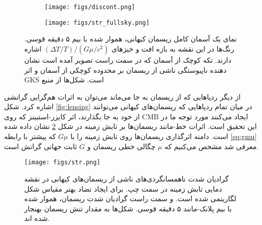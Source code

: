      
\begin{figure}[h!]
	\centering
	\begin{subfigure}[t]{.3\textwidth}
		\centering
		\texttt{[image: figs/discont.png]}
	\end{subfigure}%
	\begin{subfigure}{.7\textwidth}
		\centering
		\texttt{[image: figs/str\_fullsky.png]}
	\end{subfigure}
	\caption{ نمای یک آسمان کامل ریسمان کیهانی، هموار شده با بیم ۵ دقیقه قوسی.  رنگ‌ها در این نقشه  به بازه افت و خیزهای 
		$(\Delta T/T)/(G\mu /c^2)$
		اشاره دارند.
		 تکه کوچک از آسمان که در سمت راست تصویر آمده است نشان دهنده ناپیوستگی ناشی از ریسمان بر محدوده کوچکی از آسمان و اثر GKS است.  شکل‌ها از منبع
		\cite{ade2014planck}	
	}
	\label{fig:discont}
\end{figure}
از دیگر ردپاهایی که از ریسمان به جا می‌ماند می‌توان به اثرات هم‌گرایی گرانشی اشاره کرد. شکل
\ref{fig:lensing}
در میان تمام ردپاهایی که ریسمان‌های کیهانی می‌توانند از خود به جا بگذارند، اثر کایزر-استبینز که روی CMB ایجاد می‌کنند مورد توجه ما در این تحقیق است. اثرات خط-مانند ریسمان‌ها بر تابش زمینه در شکل
\ref{fig:str}
نشان داده شده است. دامنه اثرگذاری ریسمان‌ها روی تابش زمینه را با $G\mu$ که پیشتر با رابطه
\ref{eq:gmu}
معرفی شد مشخص می‌کنیم که $\mu$ چگالی خطی ریسمان و $G$ ثابت جهانی گرانش است.
\cite{bouchet1988patterns}  
\begin{figure}[h!]
	\begin{center}
		\texttt{[image: figs/str.png]}
	\end{center}
	\caption[
	گرادیان شدت ناهمسانگردی‌های ناشی از ریسمان‌های کیهانی در نقشه دمایی تابش زمینه در سمت چپ. برای ایجاد تضاد بهتر مقیاس شکل‌ لگاریتمی شده است. و سمت راست گرادیان شدت ریسمان، هموار شده با بیم پلانک-مانند ۵ دقیقه قوسی. شکل‌ها به مقدار تنش ریسمان بهنجار شده اند.  
	\cite{ringeval2010cosmic}]
	{  
		گرادیان شدت ناهمسانگردی‌های ناشی از ریسمان‌های کیهانی در نقشه دمایی تابش زمینه در سمت چپ. برای ایجاد تضاد بهتر مقیاس شکل‌ لگاریتمی شده است. و سمت راست گرادیان شدت ریسمان، هموار شده با بیم پلانک-مانند ۵ دقیقه قوسی. شکل‌ها به مقدار تنش ریسمان بهنجار شده اند.     
		\cite{ringeval2010cosmic}
	}
	\label{fig:str}
\end{figure}
